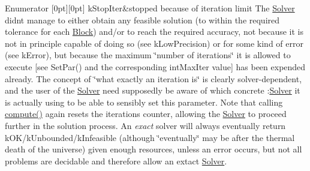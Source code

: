 \begin{DoxyEnumFields}{Enumerator}
[0pt][0pt]{}\mbox{\label{class_s_m_spp__di__unipi__it_1_1_solver_a2e0367580e249e8e6018c919bee5481da31db5c7ef1857a80e03c6cbca9af589e}} 
k\+Stop\+Iter&stopped because of iteration limit The \mbox{\hyperlink{class_s_m_spp__di__unipi__it_1_1_solver}{Solver}} didn\textquotesingle{}t manage to either obtain any feasible solution (to within the required tolerance for each \mbox{\hyperlink{class_s_m_spp__di__unipi__it_1_1_block}{Block}}) and/or to reach the required accuracy, not because it is not in principle capable of doing so (see k\+Low\+Precision) or for some kind of error (see k\+Error), but because the maximum \char`\"{}number of iterations\char`\"{} it is allowed to execute \mbox{[}see Set\+Par() and the corresponding int\+Max\+Iter value\mbox{]} has been expended already. The concept of \char`\"{}what exactly an iteration is\char`\"{} is clearly solver-\/dependent, and the user of the \mbox{\hyperlink{class_s_m_spp__di__unipi__it_1_1_solver}{Solver}} need supposedly be aware of which concrete \+:\mbox{\hyperlink{class_s_m_spp__di__unipi__it_1_1_solver}{Solver}} it is actually using to be able to sensibly set this parameter. Note that calling \mbox{\hyperlink{class_s_m_spp__di__unipi__it_1_1_solver_a504d4e3e174c7a518cc66156a8a45ce5}{compute()}} again resets the iterations counter, allowing the \mbox{\hyperlink{class_s_m_spp__di__unipi__it_1_1_solver}{Solver}} to proceed further in the solution process. An {\itshape exact} solver will always eventually return k\+O\+K/k\+Unbounded/k\+Infeasible (although \char`\"{}eventually\char`\"{} may be after the thermal death of the universe) given enough resources, unless an error occurs, but not all problems are decidable and therefore allow an extact \mbox{\hyperlink{class_s_m_spp__di__unipi__it_1_1_solver}{Solver}}. \\
\hline


\end{DoxyEnumFields}

